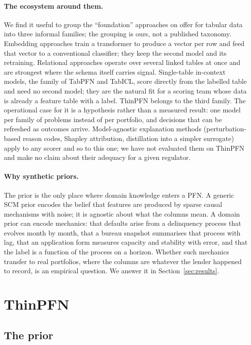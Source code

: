 \documentclass[twocolumn,10pt]{article}
\begin{document}
\paragraph{The ecosystem around them.} We find it useful to group the ``foundation'' approaches on offer for tabular
data into three informal families; the grouping is ours, not a published taxonomy. Embedding approaches train a
transformer to produce a vector per row and feed that vector to a conventional classifier; they keep the second model
and its retraining. Relational approaches operate over several linked tables at once and are strongest where the schema
itself carries signal. Single-table in-context models, the family of TabPFN and TabICL, score directly from the labelled
table and need no second model; they are the natural fit for a scoring team whose data is already a feature table with
a label. ThinPFN belongs to the third family. The operational case for it is a hypothesis rather than a measured result:
one model per family of problems instead of per portfolio, and decisions that can be refreshed as outcomes arrive.
Model-agnostic explanation methods (perturbation-based reason codes, Shapley attribution, distillation into a simpler
surrogate) apply to any scorer and so to this one; we have not evaluated them on ThinPFN and make no claim about
their adequacy for a given regulator.

\paragraph{Why synthetic priors.} The prior is the only place where domain knowledge enters a PFN. A generic SCM prior
encodes the belief that features are produced by sparse causal mechanisms with noise; it is agnostic about what the
columns mean. A domain prior can encode mechanics: that defaults arise from a delinquency process that evolves month by
month, that a bureau snapshot summarises that process with lag, that an application form measures capacity and
stability with error, and that the label is a function of the process on a horizon. Whether such mechanics transfer to
real portfolios, where the columns are whatever the lender happened to record, is an empirical question. We answer it
in Section~\ref{sec:results}.

\section{ThinPFN}

\subsection{The prior}
\end{document}
